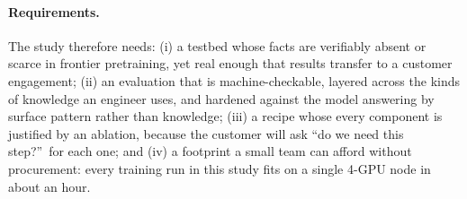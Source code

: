 \paragraph{Requirements.}
The study therefore needs: (i) a testbed whose facts are verifiably absent or
scarce in frontier pretraining, yet real enough that results transfer to a
customer engagement; (ii) an evaluation that is machine-checkable, layered
across the kinds of knowledge an engineer uses, and hardened against the
model answering by surface pattern rather than knowledge; (iii) a recipe
whose every component is justified by an ablation, because the customer will
ask ``do we need this step?''\ for each one; and (iv) a footprint a small
team can afford without procurement: every training run in this study fits on
a single 4-GPU node in about an hour.
